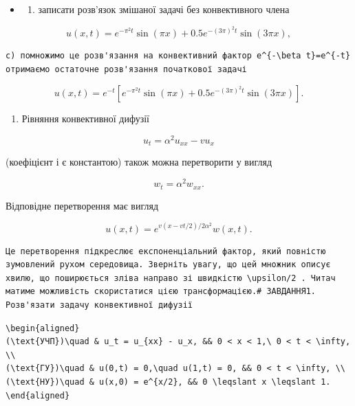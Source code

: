 \documentclass[
  ukrainian,
]{article}
\providecommand{\tightlist}{%
  \setlength{\itemsep}{0pt}\setlength{\parskip}{0pt}}
\begin{document}
\begin{itemize}
\tightlist
\item
  \begin{enumerate}
  \def\labelenumi{\alph{enumi})}
  \setcounter{enumi}{1}
  \tightlist
  \item
    записати розв'язок змішаної задачі без конвективного члена
  \end{enumerate}
\end{itemize}

\[
u(x, t) = e^{-\pi^2 t} \sin(\pi x) + 0.5e^{-(3\pi)^2 t} \sin(3\pi x),
\]

\begin{verbatim}
c) помножимо це розв'язання на конвективний фактор e^{-\beta t}=e^{-t} отримаємо остаточне розв'язання початкової задачі
\end{verbatim}

\[
u(x, t) = e^{-t} \left[ e^{-\pi^2 t} \sin(\pi x) + 0.5e^{-(3\pi)^2 t} \sin(3\pi x) \right].
\]

\begin{enumerate}
\def\labelenumi{\arabic{enumi}.}
\setcounter{enumi}{1}
\tightlist
\item
  Рівняння конвективної дифузії
\end{enumerate}

\[
u_t = \alpha^2 u_{xx} - v u_x
\]

(коефіцієнт і є константою) також можна перетворити у вигляд

\[
w_t = \alpha^2 w_{xx}.
\]

Відповідне перетворення має вигляд

\[
u(x, t) = e^{v(x-vt/2)/2\alpha^2}w(x, t).
\]

\begin{verbatim}
Це перетворення підкреслює експоненціальний фактор, який повністю зумовлений рухом середовища. Зверніть увагу, що цей множник описує хвилю, що поширюється зліва направо зі швидкістю \upsilon/2 . Читач матиме можливість скористатися цією трансформацією.# ЗАВДАННЯ1. Розв'язати задачу конвективної дифузії
\end{verbatim}

\begin{verbatim}
\begin{aligned}
(\text{УЧП})\quad & u_t = u_{xx} - u_x, && 0 < x < 1,\ 0 < t < \infty, \\
(\text{ГУ})\quad & u(0,t) = 0,\quad u(1,t) = 0, && 0 < t < \infty, \\
(\text{НУ})\quad & u(x,0) = e^{x/2}, && 0 \leqslant x \leqslant 1.
\end{aligned}
\end{verbatim}
\end{document}
